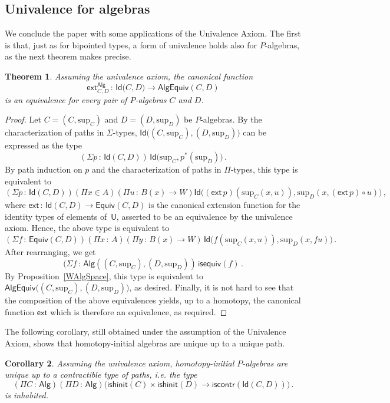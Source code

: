 \documentclass[10pt,a4paper,oneside,reqno]{amsart}
\numberwithin{equation}{section}
\theoremstyle{mythm}
\newtheorem{theorem}{Theorem}[section]
\newtheorem{corollary}[theorem]{Corollary}
\theoremstyle{mydef}
\theoremstyle{myrmk}
\newcommand{\co}{\,{:}\,}
\newcommand{\iscontr}{\mathsf{iscontr}}
\newcommand{\isequiv}{\mathsf{isequiv}}
\newcommand{\isalghinit}{\mathsf{ishinit}}
\newcommand{\ext}{\mathsf{ext}}
\newcommand{\Id}{\mathsf{Id}}
\newcommand{\U}{\mathsf{U}}
\newcommand{\Palg}{\mathsf{Alg}}
\renewcommand{\sup}{\mathrm{sup}}
\newcommand{\AlgEquiv}{\mathsf{AlgEquiv}}
\begin{document}
\subsection*{Univalence for algebras} \label{sec:univalencealgebras}
We conclude the paper with some applications of the Univalence Axiom. The first is that, just as for bipointed 
types, a form of univalence holds also for $P$-algebras, as the next theorem makes precise. 


\begin{theorem}\label{thm:Punivalence} Assuming the univalence axiom, 
 the canonical function
\[ 
\ext^\Palg_{C,D} \co \Id \big(C,D\big) \to  \AlgEquiv(C,D) 
\]
is an equivalence for every pair of $P$-algebras $C$ and $D$.
\end{theorem}

\begin{proof} 
Let $C = (C,\sup_C)$ and $D= (D,\sup_D)$ be $P$-algebras. By the characterization of paths in $\Sigma$-types, 
$\Id \big( (C,\sup_C) ,  (D,\sup_D) \big)$ can be expressed as the type
\[
(\Sigma p \co \Id(C, D)) \,  \Id \big( \sup_C ,  p^*(\sup_D)  \big) \, .
\]
By path induction on $p$ and the characterization of paths in $\Pi$-types, this type is equivalent to
\[  
(\Sigma p \co \Id(C,D))
(\Pi x \in A) 
(\Pi u \co B(x) \to W)
\Id \big(  (\ext \, p)( \sup_C(x,u)),  \sup_D(x, (\ext \, p ) \circ u) \big) \, , 
\]
where $\ext \co \Id(C,D) \to \mathsf{Equiv}(C,D)$ is the canonical extension function for the identity types of elements
of~$\U$, asserted to be an equivalence by the univalence axiom. Hence, the above type is equivalent to
\[
(\Sigma f \co \mathsf{Equiv}(C,D)) 
(\Pi x  \co A) 
(\Pi y \co B(x) \to W) \, 
\Id \big( f (\sup_C(x,u))  , \sup_D (x, f u) \big) \, .
\]
After rearranging, we get
\[
(\Sigma f \co \Palg ( (C,\sup_C),  (D,\sup_D) ) \, \isequiv( f ) \, .
\]
By Proposition~\ref{WAlgSpace}, this type is equivalent to $\AlgEquiv \big( (C,\sup_C),  (D,\sup_D)\big)$, as desired. Finally, it is not hard to see that the composition of the above equivalences yields, up to a homotopy, the canonical function $\ext$ which is therefore an equivalence, as required.
\end{proof} 

The following corollary, still obtained under the assumption of the Univalence Axiom, shows that
homotopy-initial algebras are unique up to a unique path.

\begin{corollary}  Assuming the univalence axiom,
homotopy-initial $P$-algebras are unique up to a  contractible type of paths, i.e. the type
\[ 
(\Pi C \co \Palg) (\Pi D \co \Palg) \big( \isalghinit(C) \times \isalghinit(D)  \to 
\iscontr(\Id(C,D)) \big) \, .
\] 
is inhabited.
\end{corollary}
\end{document}
